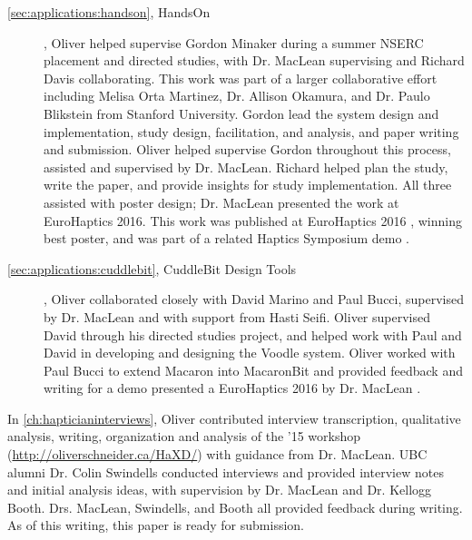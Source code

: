 \begin{description}
\item[\autoref{sec:applications:handson}, HandsOn], Oliver helped supervise Gordon Minaker during a summer NSERC placement and directed studies, with Dr. MacLean supervising and Richard Davis collaborating.
This work was part of a larger collaborative effort including Melisa Orta Martinez, Dr. Allison Okamura, and Dr. Paulo Blikstein from Stanford University.
Gordon lead the system design and implementation, study design, facilitation, and analysis, and paper writing and submission.
Oliver helped supervise Gordon throughout this process, assisted and supervised by Dr. MacLean.
Richard helped plan the study, write the paper, and provide insights for study implementation.
All three assisted with poster design; Dr. MacLean presented the work at EuroHaptics 2016.
This work was published at EuroHaptics 2016 \cite{Minaker2016}, winning best poster, and was part of a related Haptics Symposium demo \cite{Martinez-demo-hapkit2016}.

\item[\autoref{sec:applications:cuddlebit}, CuddleBit Design Tools], Oliver collaborated closely with David Marino and Paul Bucci, supervised by Dr. MacLean and with support from Hasti Seifi.
Oliver supervised David through his directed studies project, and helped work with Paul and David in developing and designing the Voodle system.
Oliver worked with Paul Bucci to extend Macaron into MacaronBit and provided feedback and writing for a demo presented a EuroHaptics 2016 by Dr. MacLean \cite{Bucci2016}.

\end{description}


In \autoref{ch:hapticianinterviews}, Oliver contributed interview transcription, qualitative analysis, writing, organization and analysis of the \haxd '15 workshop (\url{http://oliverschneider.ca/HaXD/}) with guidance from Dr. MacLean.
UBC alumni Dr. Colin Swindells conducted interviews and provided interview notes and initial analysis ideas, with supervision  by Dr. MacLean and Dr. Kellogg Booth.
Drs. MacLean, Swindells, and Booth all provided feedback during writing.
As of this writing, this paper is ready for submission.








